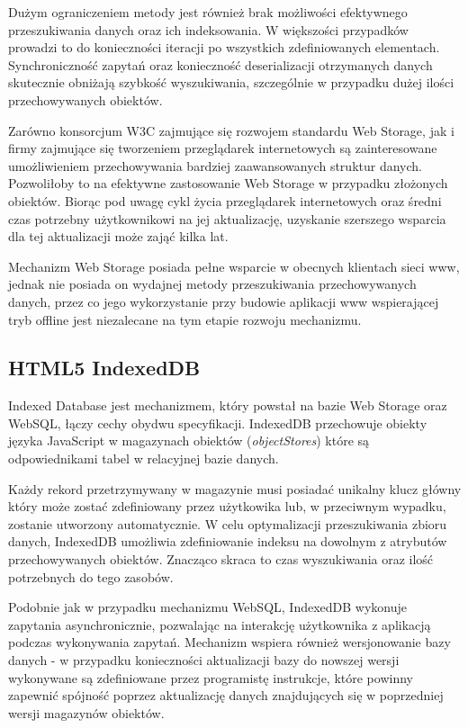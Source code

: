 Dużym ograniczeniem metody jest również brak możliwości efektywnego przeszukiwania danych oraz ich indeksowania. W większości przypadków prowadzi to do konieczności iteracji po wszystkich zdefiniowanych elementach. Synchroniczność zapytań oraz konieczność deserializacji otrzymanych danych skutecznie obniżają szybkość wyszukiwania, szczególnie w przypadku dużej ilości przechowywanych obiektów.

Zarówno konsorcjum W3C zajmujące się rozwojem standardu Web Storage, jak i firmy zajmujące się tworzeniem przeglądarek internetowych są zainteresowane umożliwieniem przechowywania bardziej zaawansowanych struktur danych. Pozwoliłoby to na efektywne zastosowanie Web Storage w przypadku złożonych obiektów. Biorąc pod uwagę cykl życia przeglądarek internetowych oraz średni czas potrzebny użytkownikowi na jej aktualizację, uzyskanie szerszego wsparcia dla tej aktualizacji może zająć kilka lat.

Mechanizm Web Storage posiada pełne wsparcie w obecnych klientach sieci www, jednak nie posiada on wydajnej metody przeszukiwania przechowywanych danych, przez co jego wykorzystanie przy budowie aplikacji www wspierającej tryb offline jest niezalecane na tym etapie rozwoju mechanizmu.

\subsection{HTML5 IndexedDB}
\label{sec:html5IndexedDB}

Indexed Database jest mechanizmem, który powstał na bazie Web Storage oraz WebSQL, łączy cechy obydwu specyfikacji. IndexedDB przechowuje obiekty języka JavaScript w magazynach obiektów (\emph{objectStores}) które są odpowiednikami tabel w relacyjnej bazie danych.

Każdy rekord przetrzymywany w magazynie musi posiadać unikalny klucz główny który może zostać zdefiniowany przez użytkowika lub, w przeciwnym wypadku, zostanie utworzony automatycznie. W celu optymalizacji przeszukiwania zbioru danych, IndexedDB umożliwia zdefiniowanie indeksu na dowolnym z atrybutów przechowywanych obiektów. Znacząco skraca to czas wyszukiwania oraz ilość potrzebnych do tego zasobów.

Podobnie jak w przypadku mechanizmu WebSQL, IndexedDB wykonuje zapytania asynchronicznie, pozwalając na interakcję użytkownika z aplikacją podczas wykonywania zapytań. Mechanizm wspiera również wersjonowanie bazy danych - w przypadku konieczności aktualizacji bazy do nowszej wersji wykonywane są zdefiniowane przez programistę instrukcje, które powinny zapewnić spójność poprzez aktualizację danych znajdujących się w poprzedniej wersji magazynów obiektów.

